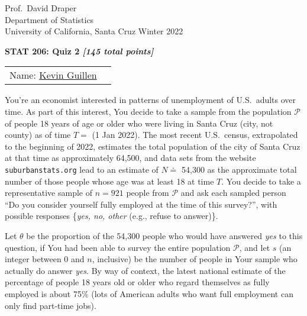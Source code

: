 \documentclass[12pt]{article}
\begin{document}
\begin{flushleft}

Prof.~David Draper \\
Department of Statistics \\
University of California, Santa Cruz
Winter 2022

\end{flushleft}

\begin{center}

\textbf{\large STAT 206: Quiz 2 \textit{[145 total points]}}

\end{center}

\begin{tabular}{ll}

\hspace*{-0.14in} Name: \underline{Kevin Guillen\hspace*{6.0in}} \\

\end{tabular}

\vspace*{0.1in}

You're an economist interested in patterns of unemployment of U.S.~adults over time. As part of this interest, You decide to take a sample from the population $\mathcal{ P }$ of people 18 years of age or older who were living in Santa Cruz (city, not county) as of time $T =$ (1 Jan 2022). The most recent U.S.~census, extrapolated to the beginning of 2022, estimates the total population of the city of Santa Cruz at that time as approximately 64,500, and data sets from the website \texttt{suburbanstats.org} lead to an estimate of $N \doteq $ 54,300 as the approximate total number of those people whose age was at least 18 at time $T$. You decide to take a representative sample of $n = 921$ people from $\mathcal{ P }$ and ask each sampled person ``Do you consider yourself fully employed at the time of this survey?'', with possible responses \{\textit{yes, no, other} (e.g., refuse to answer)\}. 

Let $\theta$ be the proportion of the 54,300 people who would have answered \textit{yes} to this question, if You had been able to survey the entire population $\mathcal{ P }$, and let $s$ (an integer between 0 and $n$, inclusive) be the number of people in Your sample who actually do answer \textit{yes}. By way of context, the latest national estimate of the percentage of people 18 years old or older who regard themselves as fully employed is about 75\% (lots of American adults who want full employment can only find part-time jobs).
\end{document}

